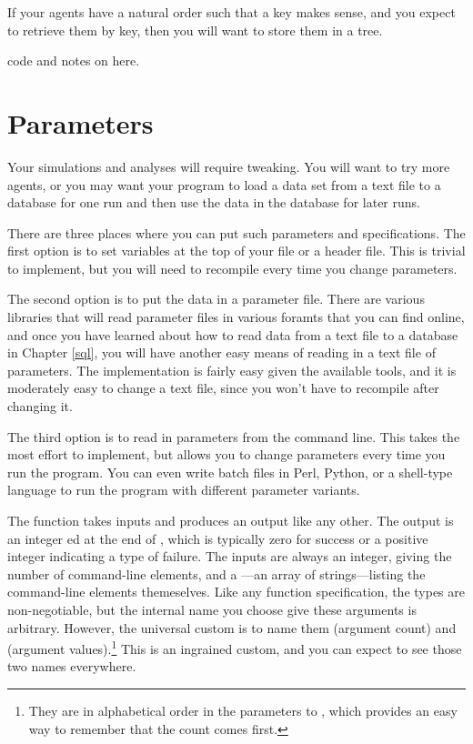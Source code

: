 If your agents have a natural order such that a key makes sense, and
you expect to retrieve them by key, then you will want to store them in
a tree.

code and notes on  here.



\section{Parameters} 
Your simulations and analyses will require
tweaking. You will want to try more agents, or you may want your program
to load a data set from a text file to a database for one run and then
use the data in the database for later runs.

There are three places where you can put such parameters and
specifications. The first option is to set variables at the top of your 
file or a header file. This is trivial to implement, but you will need
to recompile every time you change parameters.

The second option is to put the data in a parameter file. There are
various libraries that will read parameter files in various foramts that
you can find online, and once you have learned about how to read data
from a text file to a database in Chapter \ref{sql}, you will have
another easy means of reading in a text file of parameters. 
The implementation is fairly easy given the available tools, and it is
moderately easy to change a text file, since you won't have to recompile
after changing it.

The third option is to read in parameters from the command line. This
takes the most effort to implement, but allows you to change parameters
every time you run the program. You can even write batch files in Perl,
Python, or a shell-type language to run the program with different parameter variants.

The  function takes inputs and produces an output like any
other. The output is an integer ed at the end of ,
which is typically zero for success or a positive integer indicating
a type of failure. The inputs are always an integer, giving the number
of command-line elements, and a ---an array of
strings---listing the command-line elements themeselves. 
Like any function specification, the types are non-negotiable, but the
internal name you choose give these arguments is arbitrary. However, the
universal custom is to name them  (argument count) and
 (argument values).\footnote{They are in alphabetical order
in the parameters to , which provides an easy way to remember
that the count comes first.} This is an ingrained custom, and you can
expect to see those two names everywhere.

